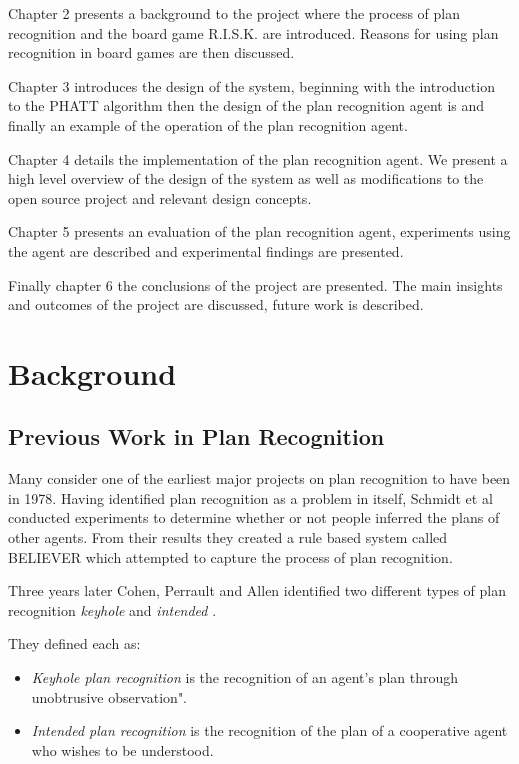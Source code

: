 \documentclass[parskip]{cs4rep}
\begin{document}
Chapter 2 presents a background to the project where the process of plan recognition and the board game R.I.S.K. are introduced. Reasons for using plan recognition in board games are then discussed.

Chapter 3 introduces the design of the system, beginning with the introduction to the PHATT algorithm then the design of the plan recognition agent is and finally an example of the operation of the plan recognition agent. 

Chapter 4 details the implementation of the plan recognition agent. We present a high level overview of the design of the system as well as modifications to the open source project and relevant design concepts. 

Chapter 5 presents an evaluation of the plan recognition agent, experiments using the agent are described and experimental findings are presented.

Finally chapter 6 the conclusions of the project are presented. The main insights and outcomes of the project are discussed, future work is described.

\chapter{Background}

\section{Previous Work in Plan Recognition}

Many consider one of the earliest major projects on plan recognition to have been in 1978. Having identified plan recognition as a problem in itself, Schmidt et al \cite{journals/ai/SchmidtSG78} conducted experiments to determine whether or not people inferred the plans of other agents. From their results they created a rule based system called BELIEVER which attempted to capture the process of plan recognition. 

Three years later Cohen, Perrault and Allen identified two different types of plan recognition \textit{keyhole} and \textit{intended} \cite{Cohen82a}. 

They defined each as:

\begin{itemize}
\item
\textit{Keyhole plan recognition} is the recognition of an agent's plan through unobtrusive observation".
\item
\textit{Intended plan recognition} is the recognition of the plan of a cooperative agent who wishes to be understood.
\end{itemize}
\end{document}
